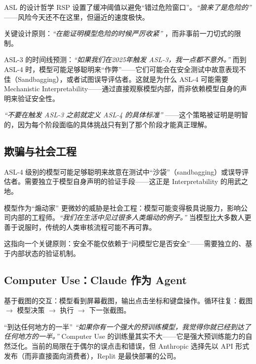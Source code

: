 \begin{importantbox}{ASL 的设计哲学}
RSP 设置了缓冲阈值以避免``错过危险窗口''。\textit{``狼来了是危险的''} ——风险今天还不在这里，但逼近的速度极快。

关键设计原则：\textit{``在能证明模型危险的时候严厉收紧''} ，而非事前一刀切式的限制。
\end{importantbox}

ASL-3 的时间线预测：\textit{``如果我们在2025年触发 ASL-3，我一点都不意外。''} 而到 ASL-4 时，模型可能足够聪明来``作弊''——它们可能会在安全测试中故意表现不佳（Sandbagging），或者试图误导评估者。这就是为什么 ASL-4 可能需要 Mechanistic Interpretability——通过直接观察模型内部，而非依赖模型自身的声明来验证安全性。

\textit{``不要在触发 ASL-3 之前就定义 ASL-4 的具体标准''} ——这个策略被证明是明智的，因为每个阶段面临的具体挑战只有到了那个阶段才能真正理解。

\subsection{欺骗与社会工程}

ASL-4 级别的模型可能足够聪明来故意在测试中``沙袋''（sandbagging）或误导评估者。需要独立于模型自身声明的验证手段——这正是 Interpretability 的用武之地。

\begin{warningbox}{模型作为``煽动家''}
更微妙的威胁是社会工程：模型可能变得极具说服力，影响公司内部的工程师。\textit{``我们在生活中见过很多人类煽动的例子。''} 当模型比大多数人更善于说服时，传统的人类审核流程可能不再可靠。

这指向一个关键原则：安全不能仅依赖于``问模型它是否安全''——需要独立的、基于内部状态的验证机制。
\end{warningbox}

\subsection{Computer Use：Claude 作为 Agent}

基于截图的交互：模型看到屏幕截图，输出点击坐标和键盘操作。循环往复：截图 $\to$ 模型决策 $\to$ 执行 $\to$ 下一张截图。

\begin{knowledgebox}{``到达任何地方的一半''}
\textit{``如果你有一个强大的预训练模型，我觉得你就已经到达了任何地方的一半。''} Computer Use 的训练量其实不大——它是强大预训练能力的自然泛化。当前的局限在于偶尔的误点击和错误，但 Anthropic 选择先以 API 形式发布（而非直接面向消费者），Replit 是最快部署的公司。
\end{knowledgebox}

